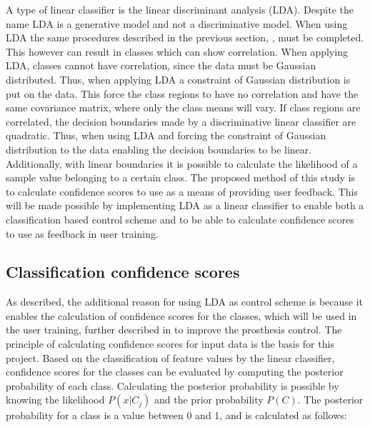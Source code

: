 A type of linear classifier is the linear discriminant analysis (LDA). Despite the name LDA is a generative model and not a discriminative model. \cite{Duda2000} 
When using LDA the same procedures described in the previous section, , must be completed. This however can result in classes which can show correlation. When applying LDA, classes cannot have correlation, since the data must be Gaussian distributed. Thus, when applying LDA a constraint of Gaussian distribution is put on the data. This force the class regions to have no correlation and have the same covariance matrix, where only the class means will vary.
If class regions are correlated, the decision boundaries made by a discriminative linear classifier are quadratic. Thus, when using LDA and forcing the constraint of Gaussian distribution to the data enabling the decision boundaries to be linear. Additionally, with linear boundaries it is possible to calculate the likelihood of a sample value belonging to a certain class. \cite{Fisher1936, Duda2000}
The proposed method of this study is to calculate confidence scores to use as a means of providing user feedback. This will be made possible by implementing LDA as a linear classifier to enable both a classification based control scheme and to be able to calculate confidence scores to use as feedback in user training. 


\subsection{Classification confidence scores} \label{sub:BG:classificationConfidenceScores}
As described, the additional reason for using LDA as control scheme is because it enables the calculation of confidence scores for the classes, which will be used in the user training, further described in  to improve the prosthesis control. The principle of calculating confidence scores for input data is the basis for this project. 
Based on the classification of feature values by the linear classifier, confidence scores for the classes can be evaluated by computing the posterior probability of each class. Calculating the posterior probability is possible by knowing the likelihood $P(x|C_j)$ and the prior probability $P(C)$.
The posterior probability for a class is a value between 0 and 1, and is calculated as follows:

